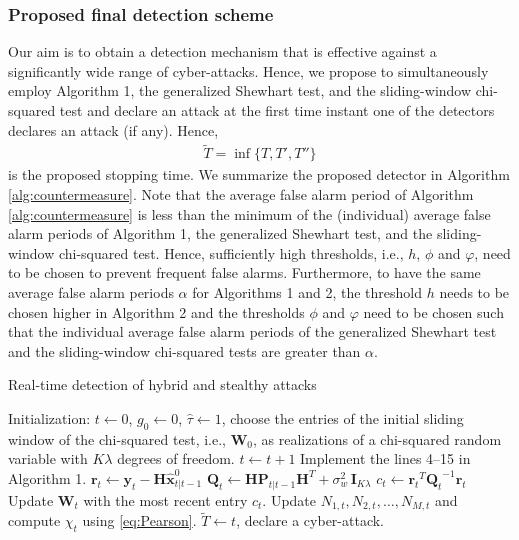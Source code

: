 \documentclass[onecolumn]{IEEEtran}
\def\inf{\mathop{\mathrm{inf}}}
\begin{document}
\subsubsection{Proposed final detection scheme}

Our aim is to obtain a detection mechanism that is effective against a significantly wide range of cyber-attacks. Hence, we propose to simultaneously employ Algorithm 1, the generalized Shewhart test, and the sliding-window chi-squared test and declare an attack at the first time instant one of the detectors declares an attack (if any). Hence,
\begin{gather}\nonumber
\tilde{T} = \inf\{T,T',T''\}
\end{gather}
is the proposed stopping time. We summarize the proposed detector in Algorithm \ref{alg:countermeasure}. Note that the average false alarm period of Algorithm \ref{alg:countermeasure} is less than the minimum of the (individual) average false alarm periods of Algorithm 1, the generalized Shewhart test, and the sliding-window chi-squared test. Hence, sufficiently high thresholds, i.e., $h$, $\phi$ and $\varphi$, need to be chosen to prevent frequent false alarms. Furthermore, to have the same average false alarm periods $\alpha$ for Algorithms 1 and 2, the threshold $h$ needs to be chosen higher in Algorithm 2 and the thresholds $\phi$ and $\varphi$ need to be chosen such that the individual average false alarm periods of the generalized Shewhart test and the sliding-window chi-squared tests are greater than $\alpha$.

\begin{algorithm}[t]\small
\caption{\small Real-time detection of hybrid and stealthy attacks}
\label{alg:countermeasure}
\baselineskip=0.4cm
\begin{algorithmic}[1]
\STATE Initialization: $t \gets 0$, $g_{0} \gets 0$, $\hat{\tau} \gets 1$, choose the entries of the initial sliding window of the chi-squared test, i.e., $\mathbf{W}_0$, as realizations of a chi-squared random variable with $K \lambda$ degrees of freedom.
    \STATE $t \gets t+1$
    \STATE Implement the lines 4--15 in Algorithm 1.
    \STATE $\mathbf{r}_t \gets \mathbf{y}_t - \mathbf{H} \hat{\mathbf{x}}_{t|t-1}^{0}$
    \STATE $\mathbf{Q}_t \gets \mathbf{H} \mathbf{P}_{t|t-1} \mathbf{H}^T + \sigma_w^2 \, \mathbf{I}_{K \lambda}$
    \STATE $c_t \gets {\mathbf{r}_t}^T  {\mathbf{Q}_t}^{-1} \mathbf{r}_t$
    \STATE Update $\mathbf{W}_t$ with the most recent entry $c_t$.
    \STATE Update $N_{1,t}, N_{2,t}, \dots, N_{M,t}$ and compute $\chi_t$ using \eqref{eq:Pearson}.
\ENDWHILE
\STATE $\tilde{T} \gets t$, declare a cyber-attack.
\end{algorithmic}
\end{algorithm}
\end{document}
